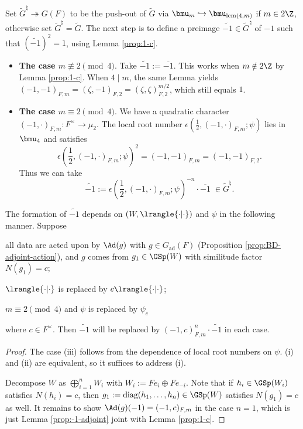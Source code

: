 \documentclass[a4paper,10pt]{article}
\begin{document}
\begin{definition}\label{def:lifting-minus-1}
	Set $\tilde{G}^\natural \twoheadrightarrow G(F)$ to be the push-out of $\tilde{G}$ via $\bmu_m \hookrightarrow \bmu_{\text{lcm}(4,m)}$ if $m \in 2\Z$, otherwise set $\tilde{G}^\natural = \tilde{G}$. The next step is to define a preimage $\widetilde{-1} \in \tilde{G}^\natural$ of $-1$ such that $(\widetilde{-1})^2 = 1$, using Lemma \ref{prop:1-c}.
	\begin{itemize}
		\item \textbf{The case $m \not\equiv 2 \pmod 4$}. Take $\widetilde{-1} := \overline{-1}$. This works when $m \notin 2\Z$ by Lemma \ref{prop:1-c}. When $4 \mid m$, the same Lemma yields $(-1, -1)_{F,m} = (\zeta, -1)_{F,2} = (\zeta, \zeta)_{F,2}^{m/2}$, which still equals $1$.

		\item \textbf{The case $m \equiv 2 \pmod 4$}. We have a quadratic character $(-1, \cdot)_{F,m}: F^\times \to \mu_2$. The local root number $\epsilon\left( \frac{1}{2}, (-1, \cdot)_{F,m}; \psi \right)$ lies in $\bmu_4$ and satisfies
		\[ \epsilon\left( \frac{1}{2}, (-1, \cdot)_{F,m} ; \psi \right)^2 = (-1, -1)_{F,m} = (-1, -1)_{F,2}. \]
		Thus we can take
		\[ \widetilde{-1} := \epsilon\left( \frac{1}{2}, (-1, \cdot)_{F,m}; \psi\right)^{-n} \cdot \overline{-1} \; \in \tilde{G}^\natural. \]
	\end{itemize}
\end{definition}

\begin{lemma}\label{prop:splitting-variance}
	The formation of $\widetilde{-1}$ depends on $(W, \lrangle{\cdot|\cdot})$ and $\psi$ in the following manner. Suppose
	\begin{compactenum}[(i)]
		\item all data are acted upon by $\Ad(g)$ with $g \in G_\mathrm{ad}(F)$ (Proposition \ref{prop:BD-adjoint-action}), and $g$ comes from $g_1 \in \GSp(W)$ with similitude factor $N(g_1) = c$;
		\item $\lrangle{\cdot|\cdot}$ is replaced by $c\lrangle{\cdot|\cdot}$;
		\item $m \equiv 2 \pmod 4$ and $\psi$ is replaced by $\psi_c$
	\end{compactenum}
	where $c \in F^\times$. Then $\widetilde{-1}$ will be replaced by $(-1, c)_{F,m}^n \cdot \widetilde{-1}$ in each case.
\end{lemma}
\begin{proof}
	The case (iii) follows from the dependence of local root numbers on $\psi$. (i) and (ii) are equivalent, so it suffices to address (i).

	Decompose $W$ as $\bigoplus_{i=1}^n W_i$ with $W_i := Fe_i \oplus Fe_{-i}$. Note that if $h_i \in \GSp(W_i)$ satisfies $N(h_i)=c$, then $g_1 := \text{diag}(h_1, \ldots, h_n) \in \GSp(W)$ satisfies $N(g_1) = c$ as well. It remains to show $\Ad(g)(-1) = (-1,c)_{F,m}$ in the case $n=1$, which is just Lemma \ref{prop:-1-adjoint} joint with Lemma \ref{prop:1-c}.
\end{proof}
\end{document}
